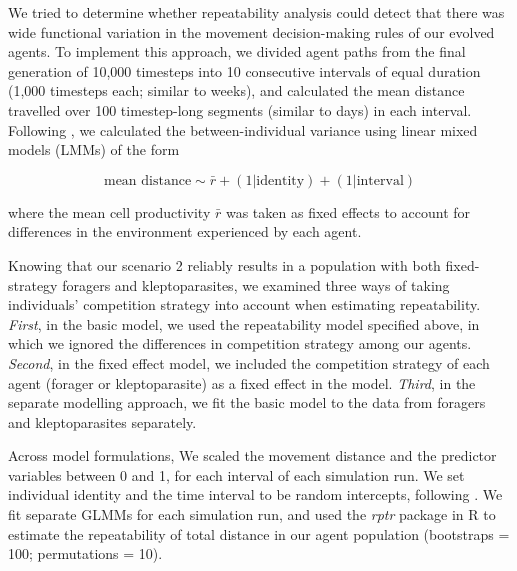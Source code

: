     We tried to determine whether repeatability analysis could detect that there was wide functional variation in the movement decision-making rules of our evolved agents.
    To implement this approach, we divided agent paths from the final generation of 10,000 timesteps into 10 consecutive intervals of equal duration (1,000 timesteps each; similar to weeks), and calculated the mean distance travelled over 100 timestep-long segments (similar to days) in each interval.
    Following \cite{hertel2019}, we calculated the between-individual variance using linear mixed models (LMMs) of the form
    \begin{linenomath*}
        \begin{equation}
            \text{mean distance} \sim \bar{r} + (1 | \text{identity}) + (1 | \text{interval})
        \end{equation}
    \end{linenomath*}
    where the mean cell productivity $\bar{r}$ was taken as fixed effects to account for differences in the environment experienced by each agent.
    
    Knowing that our scenario 2 reliably results in a population with both fixed-strategy foragers and kleptoparasites, we examined three ways of taking individuals' competition strategy into account when estimating repeatability.
    \textit{First}, in the basic model, we used the repeatability model specified above, in which we ignored the differences in competition strategy among our agents.
    \textit{Second}, in the fixed effect model, we included the competition strategy of each agent (forager or kleptoparasite) as a fixed effect in the model.
    \textit{Third}, in the separate modelling approach, we fit the basic model to the data from foragers and kleptoparasites separately.
    
    Across model formulations, We scaled the movement distance and the predictor variables between 0 and 1, for each interval of each simulation run.
    We set individual identity and the time interval to be random intercepts, following \citep{hertel2020}.
    We fit separate GLMMs for each simulation run, and used the \textit{rptr} package in R \citep{nakagawa2010} to estimate the repeatability of total distance in our agent population (bootstraps = 100; permutations = 10).
    

